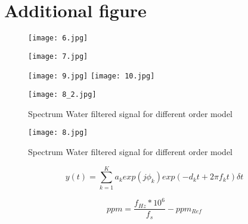 \section{Additional figure}\label{S1A1}


\begin{figure}[!htbp]
\centering
\texttt{[image: 6.jpg]}
\end{figure}

\begin{figure}[!htbp]
\centering
\texttt{[image: 7.jpg]}
\caption{}
\end{figure}






\begin{figure}[!htbp]
%
\centering
\texttt{[image: 9.jpg]}
\label{fig5}
\endminipage\hfill
{}%
\centering
\texttt{[image: 10.jpg]}
\label{fig4}
\endminipage\hfill
\caption{}
\end{figure}

\begin{figure}[!htbp]
\centering
\texttt{[image: 8\_2.jpg]}
\caption{Spectrum Water filtered signal for different order model}\label{fig6}
\end{figure}

\begin{figure}[!htbp]
\centering
\texttt{[image: 8.jpg]}
\caption{Spectrum Water filtered signal for different order model}\label{fig7}
\end{figure}




\begin{equation}\label{eq1}
y(t)=\sum_{k=1}^{K} a_{k}exp(j\phi_{k})exp(-d_{k}t+2\pi f_{k}t)\delta t
\end{equation}

\begin{equation}
ppm=\frac{f_{Hz}*10^6}{f_{s}}-ppm_{Ref}
\end{equation}